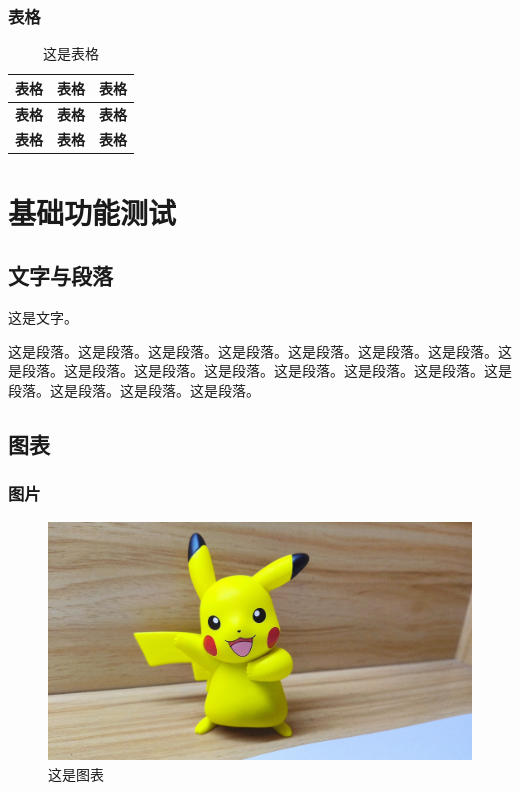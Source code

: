 \begin{ujnbody}
    \subsection{表格}

    \begin{table}[htbp]
        \centering
        \caption{这是表格}
        \begin{tabular}{|c|c|c|}
            \hline
            \multicolumn{1}{|c|}{\textbf{表格}} & \multicolumn{1}{c|}{\textbf{表格}} & \multicolumn{1}{c|}{\textbf{表格}} \\ \hline
            \multicolumn{1}{|c|}{\textbf{表格}} & \multicolumn{1}{c|}{\textbf{表格}} & \multicolumn{1}{c|}{\textbf{表格}} \\ \hline
            \multicolumn{1}{|c|}{\textbf{表格}} & \multicolumn{1}{c|}{\textbf{表格}} & \multicolumn{1}{c|}{\textbf{表格}} \\ \hline
        \end{tabular}
    \end{table}
    \chapter{基础功能测试}
    \section{文字与段落}
    这是文字。

    这是段落。这是段落。这是段落。这是段落。这是段落。这是段落。这是段落。这是段落。这是段落。这是段落。这是段落。这是段落。这是段落。这是段落。这是段落。这是段落。这是段落。这是段落。
    \section{图表}

    \subsection{图片}

    \begin{figure}[htbp]
        \centering
        \includegraphics[scale=0.1, ]{figures/pikachu.jpg}
        \caption{这是图表}
    \end{figure}


\end{ujnbody}

